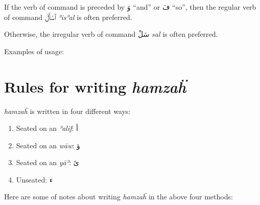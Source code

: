 \documentclass[
  10pt,
]{book}
\providecommand{\tightlist}{%
  \setlength{\itemsep}{0pt}\setlength{\parskip}{0pt}}
\begin{document}
If the verb of command is preceded by
\foreignlanguage{arabic}{وَ} \enquote{and}
or
\foreignlanguage{arabic}{فَ} \enquote{so}, then the regular verb of command
\foreignlanguage{arabic}{ٱسْأَلْ} \emph{ʾisʾal} is often preferred.

Otherwise, the irregular verb of command
\foreignlanguage{arabic}{سَلْ} \emph{sal} is often preferred.

Examples of usage:

\appendix


\chapter{\texorpdfstring{Rules for writing \emph{hamzaḧ}}{Rules for writing hamzaḧ}}\label{hamzarules}

\emph{hamzaḧ} is written in four different ways:

\begin{enumerate}
\def\labelenumi{\arabic{enumi}.}
\tightlist
\item
  Seated on an \emph{ʾalif}: \foreignlanguage{arabic}{أ}
\item
  Seated on an \emph{wāw}: \foreignlanguage{arabic}{ؤ}
\item
  Seated on an \emph{yāʾ}: \foreignlanguage{arabic}{ئ}
\item
  Unseated: \foreignlanguage{arabic}{ء}
\end{enumerate}

Here are some of notes about writing \emph{hamzaḧ} in the above four methods:
\end{document}
